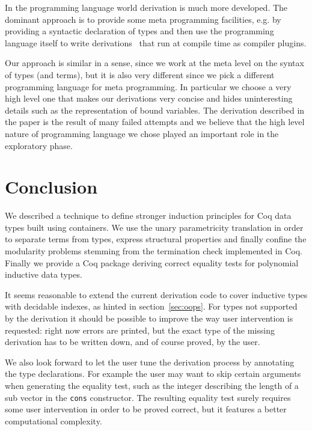 \documentclass[sigplan,10pt,review]{acmart}\settopmatter{printfolios=true,printccs=false,printacmref=false}
\begin{document}
In the programming language world derivation is much more developed.
The dominant approach is to provide some meta programming facilities,
e.g. by providing a syntactic declaration of types and then use the
programming language itself to write 
derivations~\cite{Sheard:2002:TMH:636517.636528} that run at compile
time as compiler plugins. 

Our approach is similar in a sense, since we work at the meta level on
the syntax of types (and terms), but it is also very different since
we pick a different programming language for meta programming.  In
particular we choose a very high level one that makes our derivations
very concise and hides uninteresting details such as the
representation of bound variables.
The derivation described in the paper is the result of many failed
attempts and we believe that the high level nature of programming
language we chose played an important role in the exploratory phase.

\section{Conclusion} %
\label{sec:conclusion}

We described a technique to define stronger induction principles
for Coq data types built using containers. We use the unary
parametricity translation in order to separate terms from types,
express structural properties and finally confine the modularity
problems stemming from the termination check implemented in Coq.
Finally we provide a Coq package deriving correct equality tests
for polynomial inductive data types.

It seems reasonable to extend the current derivation code to cover
inductive types with decidable indexes, as hinted in
section~\ref{sec:oops}. For types not supported by the derivation
it should be possible
to improve the way user intervention is requested: right now errors
are printed, but the exact type of the missing derivation
has to be written down, and of course proved, by the user.

We also look forward to let the user tune
the derivation process by annotating the type declarations.
For example the user may want to skip
certain arguments when generating the equality test, such as the
integer describing the length of a sub vector in the \lstinline+cons+
constructor. The resulting equality
test surely requires some user intervention in order 
to be proved correct, but it features a better computational complexity.
\end{document}
